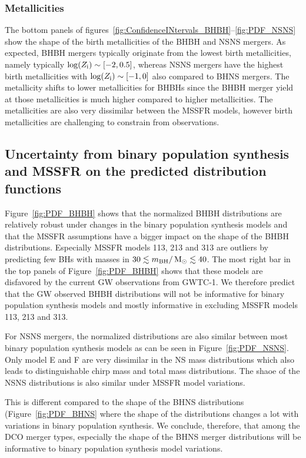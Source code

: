 \documentclass[twocolumn]{aastex63}
\newcommand\bhnsSingle{BHNS\xspace}
\newcommand{\Zi}{\ensuremath{Z_{\rm{i}}}\xspace}
\newcommand{\Msun}{\ensuremath{\,\rm{M}_{\odot}}\xspace}
\newcommand{\mbhf}{\ensuremath{m_{\rm{BH}}}\xspace}
\begin{document}
\subsubsection{Metallicities}
%
The bottom panels of figures~\ref{fig:ConfidenceINtervals_BHBH}--\ref{fig:PDF_NSNS} show the shape of the birth metallicities of the BHBH and NSNS mergers. As expected, BHBH mergers typically originate from the lowest birth metallicities, namely typically $\log(\Zi) \sim [-2, 0.5]$, whereas NSNS mergers have the highest birth metallicities with  $\log(\Zi) \sim [-1, 0]$  also compared to \bhnsSingle mergers. The metallicity shifts to lower metallicities for BHBHs since the BHBH merger yield at those metallicities is much higher compared to higher metallicities.  The metallicities are also very dissimilar between the \ac{MSSFR} models, however birth metallicities are challenging to constrain from observations. 

\subsection{Uncertainty from binary population synthesis and \ac{MSSFR} on the predicted distribution functions}
%
Figure~\ref{fig:PDF_BHBH} shows that the normalized \ac{BHBH} distributions are relatively robust under changes in the binary population synthesis models and that the \ac{MSSFR} assumptions have a bigger impact on the shape of the BHBH distributions. 
Especially \ac{MSSFR} models 113, 213 and 313 are outliers  by predicting few \acp{BH} with masses in $30 \lesssim \mbhf / \Msun \lesssim 40$. The most right bar in the top panels of Figure~\ref{fig:PDF_BHBH} shows that these models are disfavored by the current \ac{GW} observations from GWTC-1.  We therefore predict that the \ac{GW} observed BHBH distributions will not be informative for binary population synthesis models and mostly informative in excluding \ac{MSSFR} models 113, 213 and 313. 

For NSNS mergers, the normalized distributions are also similar between most binary population synthesis models as can be seen in Figure~\ref{fig:PDF_NSNS}. Only model E and F are very dissimilar in the \ac{NS} mass distributions which also leads to distinguishable chirp mass and total mass distributions. The shaoe of the NSNS distributions is also similar under \ac{MSSFR} model variations. 

This is different compared to the shape of the \bhnsSingle distributions (Figure~\ref{fig:PDF_BHNS} where the shape of the distributions changes a lot with variations in binary population synthesis. We conclude, therefore, that among the \ac{DCO} merger types, especially the shape of the \bhnsSingle merger distributions will be informative to binary population synthesis model variations. 
\end{document}
